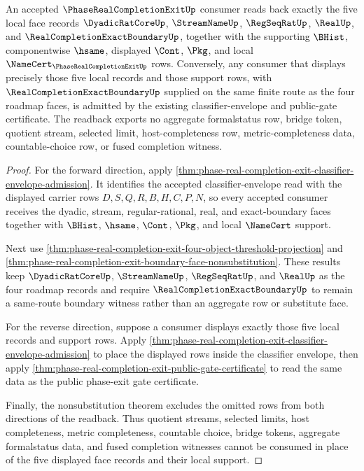 \begin{theorem}
\label{thm:phase-real-completion-exit-facewise-consumer-readback}
An accepted $\PhaseRealCompletionExitUp$ consumer reads back exactly the five local face records $\DyadicRatCoreUp$, $\StreamNameUp$, $\RegSeqRatUp$, $\RealUp$, and $\RealCompletionExactBoundaryUp$, together with the supporting $\BHist$, componentwise $\hsame$, displayed $\Cont$, $\Pkg$, and local $\NameCert_{\PhaseRealCompletionExitUp}$ rows. Conversely, any consumer that displays precisely those five local records and those support rows, with $\RealCompletionExactBoundaryUp$ supplied on the same finite route as the four roadmap faces, is admitted by the existing classifier-envelope and public-gate certificate. The readback exports no aggregate formalstatus row, bridge token, quotient stream, selected limit, host-completeness row, metric-completeness data, countable-choice row, or fused completion witness.
\end{theorem}
\begin{proof}
For the forward direction, apply \autoref{thm:phase-real-completion-exit-classifier-envelope-admission}. It identifies the accepted classifier-envelope read with the displayed carrier rows $D,S,Q,R,B,H,C,P,N$, so every accepted consumer receives the dyadic, stream, regular-rational, real, and exact-boundary faces together with $\BHist$, $\hsame$, $\Cont$, $\Pkg$, and local $\NameCert$ support.

Next use \autoref{thm:phase-real-completion-exit-four-object-threshold-projection} and \autoref{thm:phase-real-completion-exit-boundary-face-nonsubstitution}. These results keep $\DyadicRatCoreUp$, $\StreamNameUp$, $\RegSeqRatUp$, and $\RealUp$ as the four roadmap records and require $\RealCompletionExactBoundaryUp$ to remain a same-route boundary witness rather than an aggregate row or substitute face.

For the reverse direction, suppose a consumer displays exactly those five local records and support rows. Apply \autoref{thm:phase-real-completion-exit-classifier-envelope-admission} to place the displayed rows inside the classifier envelope, then apply \autoref{thm:phase-real-completion-exit-public-gate-certificate} to read the same data as the public phase-exit gate certificate.

Finally, the nonsubstitution theorem excludes the omitted rows from both directions of the readback. Thus quotient streams, selected limits, host completeness, metric completeness, countable choice, bridge tokens, aggregate formalstatus data, and fused completion witnesses cannot be consumed in place of the five displayed face records and their local support.
\end{proof}

